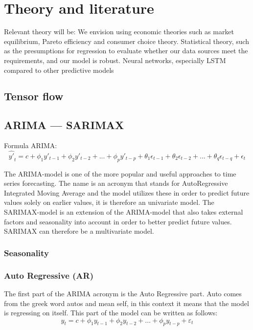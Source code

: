 \section{Theory and literature}

Relevant theory will be: 
We envision using economic theories such as market equilibrium, Pareto efficiency and consumer choice theory. 
Statistical theory, such as the presumptions for regression to evaluate whether our data sources meet the requirements, and our model is robust. 
Neural networks, especially LSTM compared to other predictive models 

\subsection{Tensor flow}

\subsection{ARIMA --- SARIMAX}
Formula ARIMA: 
\begin{equation}
\hat{y'}_t = c + \phi_1y'_{t-1} + \phi_2y'_{t-2} + ... + \phi_py'_{t-p} + \theta_1\epsilon_{t-1} + \theta_2\epsilon_{t-2} + ... + \theta_q\epsilon_{t-q} + \epsilon_t
\end{equation}

The ARIMA-model is one of the more popular and useful approaches to time series forecasting. The name is an acronym that stands for AutoRegressive Integrated Moving Average and the model utilizes these in order to predict future values solely on earlier values, it is therefore an univariate model. The SARIMAX-model is an extension of the ARIMA-model that also takes external factors and seasonality into account in order to better predict future values. SARIMAX can therefore be a multivariate model. \parencite{hyndman_athanasopoulos_2021}

\subsubsection{Seasonality}

\subsubsection{Auto Regressive (AR)}
The first part of the ARIMA acronym is the Auto Regressive part. Auto comes from the greek word autos and mean self, in this context it means that the model is regressing on itself. This part of the model can be written as follows:
\begin{equation}
y_{t} = c + \phi_{1}y_{t-1} + \phi_{2}y_{t-2} + \dots + \phi_{p}y_{t-p} + \varepsilon_{t}
\end{equation}

